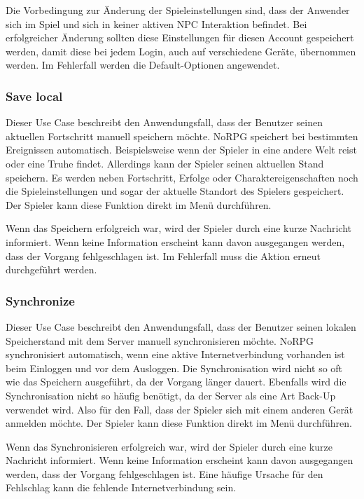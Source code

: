 			Die Vorbedingung zur Änderung der Spieleinstellungen sind, dass der Anwender sich im Spiel und sich in keiner aktiven \ac{NPC} Interaktion befindet. Bei erfolgreicher Änderung sollten diese Einstellungen für diesen Account gespeichert werden, damit diese bei jedem Login, auch auf verschiedene Geräte, übernommen werden. Im Fehlerfall werden die Default-Optionen angewendet. 
	
		\subsubsection{Save local}
			Dieser Use Case beschreibt den Anwendungsfall, dass der Benutzer seinen aktuellen Fortschritt manuell speichern möchte. NoRPG speichert bei bestimmten Ereignissen automatisch. Beispielsweise wenn der Spieler in eine andere Welt reist oder eine Truhe findet. Allerdings kann der Spieler seinen aktuellen Stand speichern. Es werden neben Fortschritt, Erfolge oder Charaktereigenschaften noch die Spieleinstellungen und sogar der aktuelle Standort des Spielers gespeichert. Der Spieler kann diese Funktion direkt im Menü durchführen.
		
			Wenn das Speichern erfolgreich war, wird der Spieler durch eine kurze Nachricht informiert. Wenn keine Information erscheint kann davon ausgegangen werden, dass der Vorgang fehlgeschlagen ist. Im Fehlerfall muss die Aktion erneut durchgeführt werden.
		
		\subsubsection{Synchronize}
			Dieser Use Case beschreibt den Anwendungsfall, dass der Benutzer seinen lokalen Speicherstand mit dem Server manuell synchronisieren möchte. NoRPG synchronisiert automatisch, wenn eine aktive Internetverbindung vorhanden ist beim Einloggen und vor dem Ausloggen. Die Synchronisation wird nicht so oft wie das Speichern ausgeführt, da der Vorgang länger dauert. Ebenfalls wird die Synchronisation nicht so häufig benötigt, da der Server als eine Art Back-Up verwendet wird. Also für den Fall, dass der Spieler sich mit einem anderen Gerät anmelden möchte. Der Spieler kann diese Funktion direkt im Menü durchführen.
	
			Wenn das Synchronisieren erfolgreich war, wird der Spieler durch eine kurze Nachricht informiert. Wenn keine Information erscheint kann davon ausgegangen werden, dass der Vorgang fehlgeschlagen ist. Eine häufige Ursache für den Fehlschlag kann die fehlende Internetverbindung sein.
		
